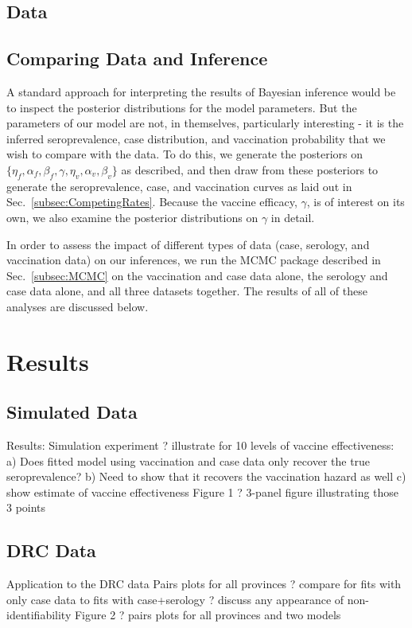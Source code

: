 \documentclass[nofootinbib,aps,pre,twocolumn,superscriptaddress,showkeys,showpacs]{revtex4-1}
\begin{document}
\subsection{Data \label{subsec:Data}}

\subsection{Comparing Data and Inference \label{subsec:Comp}}
A standard approach for interpreting the results of Bayesian inference would be to inspect the posterior distributions for the model parameters. But the parameters of our model are not, in themselves, particularly interesting - it is the inferred seroprevalence, case distribution, and vaccination probability that we wish to compare with the data. To do this, we generate the posteriors on $\{\eta_f, \alpha_f, \beta_f, \gamma, \eta_v, \alpha_v, \beta_v\}$ as described, and then draw from these posteriors to generate the seroprevalence, case, and vaccination curves as laid out in Sec.~\ref{subsec:CompetingRates}. Because the vaccine efficacy, $\gamma$, is of interest on its own, we also examine the posterior distributions on $\gamma$ in detail.

In order to assess the impact of different types of data (case, serology, and vaccination data) on our inferences, we run the MCMC package described in Sec.~\ref{subsec:MCMC} on the vaccination and case data alone, the serology and case data alone, and all three datasets together. The results of all of these analyses are discussed below.

\section{Results \label{sec:Results}}
\subsection{Simulated Data \label{subsec:SimDat}}
Results:
Simulation experiment ? illustrate for 10 levels of vaccine effectiveness:
	a) Does fitted model using vaccination and case data only recover the true seroprevalence?
	b) Need to show that it recovers the vaccination hazard as well
	c) show estimate of vaccine effectiveness
Figure 1 ? 3-panel figure illustrating those 3 points

\subsection{DRC Data \label{subsec:DRC}}
Application to the DRC data
	Pairs plots for all provinces ? compare for fits with only case data to fits with case+serology ? discuss any appearance of non-identifiability 	
Figure 2 ? pairs plots for all provinces and two models
	
\end{document}
